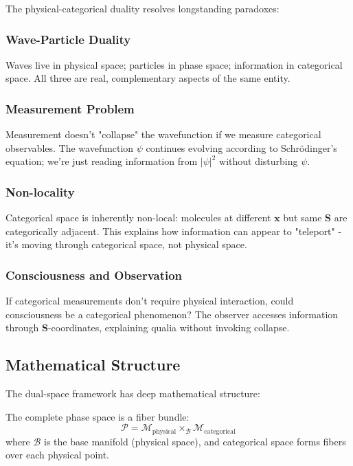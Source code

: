 The physical-categorical duality resolves longstanding paradoxes:

\subsubsection{Wave-Particle Duality}

Waves live in physical space; particles in phase space; information in categorical space. All three are real, complementary aspects of the same entity.

\subsubsection{Measurement Problem}

Measurement doesn't "collapse" the wavefunction if we measure categorical observables. The wavefunction $\psi$ continues evolving according to Schrödinger's equation; we're just reading information from $|\psi|^2$ without disturbing $\psi$.

\subsubsection{Non-locality}

Categorical space is inherently non-local: molecules at different $\mathbf{x}$ but same $\mathbf{S}$ are categorically adjacent. This explains how information can appear to "teleport" - it's moving through categorical space, not physical space.

\subsubsection{Consciousness and Observation}

If categorical measurements don't require physical interaction, could consciousness be a categorical phenomenon? The observer accesses information through $\mathbf{S}$-coordinates, explaining qualia without invoking collapse.

\subsection{Mathematical Structure}

The dual-space framework has deep mathematical structure:

\begin{proposition}
The complete phase space is a fiber bundle:
\begin{equation}
\mathcal{P} = \mathcal{M}_{\text{physical}} \times_{\mathcal{B}} \mathcal{M}_{\text{categorical}}
\end{equation}
where $\mathcal{B}$ is the base manifold (physical space), and categorical space forms fibers over each physical point.
\end{proposition}

